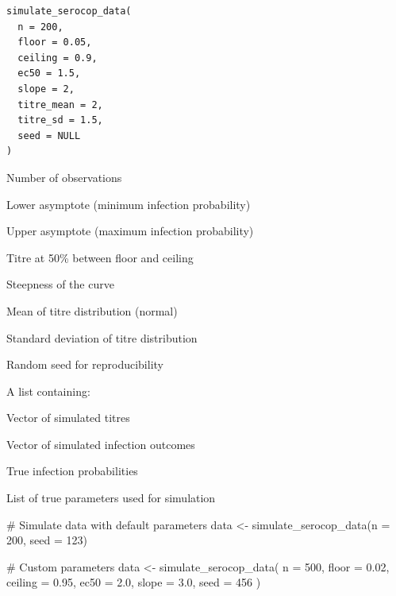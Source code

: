 \documentclass[a4paper]{book}
\begin{document}
%
\begin{Usage}
\begin{verbatim}
simulate_serocop_data(
  n = 200,
  floor = 0.05,
  ceiling = 0.9,
  ec50 = 1.5,
  slope = 2,
  titre_mean = 2,
  titre_sd = 1.5,
  seed = NULL
)
\end{verbatim}
\end{Usage}
%
\begin{Arguments}
\begin{ldescription}
\item[\code{n}] Number of observations

\item[\code{floor}] Lower asymptote (minimum infection probability)

\item[\code{ceiling}] Upper asymptote (maximum infection probability)

\item[\code{ec50}] Titre at 50\% between floor and ceiling

\item[\code{slope}] Steepness of the curve

\item[\code{titre\_mean}] Mean of titre distribution (normal)

\item[\code{titre\_sd}] Standard deviation of titre distribution

\item[\code{seed}] Random seed for reproducibility
\end{ldescription}
\end{Arguments}
%
\begin{Value}
A list containing:
\begin{ldescription}
\item[\code{titre}] Vector of simulated titres
\item[\code{infected}] Vector of simulated infection outcomes
\item[\code{prob\_true}] True infection probabilities
\item[\code{params}] List of true parameters used for simulation
\end{ldescription}
\end{Value}
%
\begin{Examples}
\begin{ExampleCode}
# Simulate data with default parameters
data <- simulate_serocop_data(n = 200, seed = 123)

# Custom parameters
data <- simulate_serocop_data(
  n = 500,
  floor = 0.02,
  ceiling = 0.95,
  ec50 = 2.0,
  slope = 3.0,
  seed = 456
)
\end{ExampleCode}
\end{Examples}
\printindex{}
\end{document}
